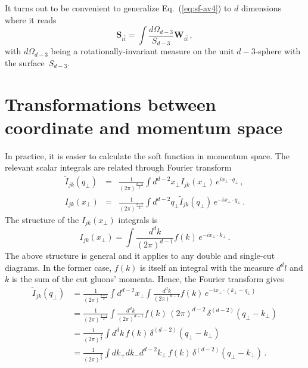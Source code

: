 \documentclass[a4paper,11pt]{report}
\numberwithin{equation}{section}
\newcommand{\bfS}{\bm{S}}
\begin{document}
It turns out to be convenient to generalize Eq.~(\ref{eq:sf-av4}) to $d$
dimensions where it reads
%
\begin{equation}
  \bfS_{i\bar i} = \int \frac{d\Omega_{d-3}}{S_{d-3}} \bm{W}_{i\bar i}\,,
  \label{eq:sf-avd}
\end{equation}
%
with $d\Omega_{d-3}$ being a rotationally-invariant measure on the unit
$d-3$-sphere with the surface~$S_{d-3}$.

\section{Transformations between coordinate and momentum space}
\label{sec:trans-coor-mom}

In practice, it is easier to calculate the soft function in momentum space. The
relevant scalar integrals are related through Fourier transform
%
\begin{subequations}
   \label{eq:fourier-transformd}
   \begin{eqnarray}
     \tilde I_{jk} (q_\perp)& = &
     \frac{1}{\left(2\pi\right)^{\frac{d-2}{2}}}
     \int d^{d-2} x_\perp I_{jk} (x_\perp) \, e^{i x_\perp \cdot q_\perp}\,,
     \\
      \label{eq:fourier-transform-inv}
      I_{jk} (x_\perp)& = &
     \frac{1}{\left(2\pi\right)^{\frac{d-2}{2}}}
     \int d^{d-2} q_\perp \tilde I_{jk} (q_\perp) \, e^{-i x_\perp \cdot
     q_\perp}\,.
   \end{eqnarray}
\end{subequations}
%
The structure of the $I_{jk}(x_\perp)$ integrals is
%
\begin{equation}
  I_{jk}(x_\perp) = 
  \int \frac{d^dk}{(2\pi)^{d-1}} f(k)\, e^{-i x_\perp \cdot k_\perp}\,.
\end{equation}
%
The above structure is general and it applies to any double and single-cut
diagrams. In the former case, $f(k)$ is itself an integral with the measure
$d^dl$ and $k$ is the sum of the cut gluons' momenta.
%
Hence, the Fourier transform gives
%
\begin{align}
  \tilde I_{jk}(q_\perp) 
  & = 
  \frac{1}{\left(2\pi\right)^{\frac{d-2}{2}}}
  \int d^{d-2} x_\perp
  \int \frac{d^dk}{(2\pi)^{d-1}}f(k)\, e^{-i x_\perp \cdot (k_\perp-q_\perp)}
  \nonumber \\
  & = 
  \frac{1}{\left(2\pi\right)^{\frac{d-2}{2}}}
  \int \frac{d^dk}{(2\pi)^{d-1}}f(k)\,
  (2\pi)^{d-2}\, \delta^{(d-2)}(q_\perp-k_\perp)
  \nonumber \\
  & = 
  \frac{1}{\left(2\pi\right)^{\frac{d}{2}}}
  \int d^dk\, f(k)\, \delta^{(d-2)}(q_\perp-k_\perp)
  \nonumber \\
  & = 
  \frac{1}{\left(2\pi\right)^{\frac{d}{2}}}
  \int dk_+ dk_-d^{d-2}k_\perp\, f(k)\, \delta^{(d-2)}(q_\perp-k_\perp)\,.
\end{align}
\end{document}

